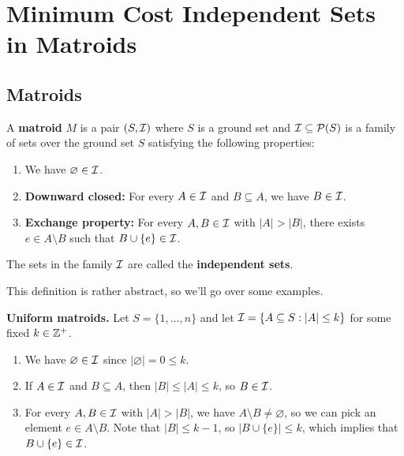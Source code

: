 \section{Minimum Cost Independent Sets in Matroids}\label{sec:4}

\subsection{Matroids}\label{subsec:4.1}
A {\bf matroid} $M$ is a pair $(S, {\cal I})$ where $S$ is a ground set 
and ${\cal I} \subseteq {\cal P}(S)$ is a family of sets over the 
ground set $S$ satisfying the following properties:
\begin{enumerate}[(1)]
    \item We have $\varnothing \in {\cal I}$.
    \item {\bf Downward closed:} For every $A \in {\cal I}$ and $B \subseteq A$, 
    we have $B \in {\cal I}$. 
    \item {\bf Exchange property:} For every $A, B \in {\cal I}$ with 
    $|A| > |B|$, there exists $e \in A \setminus B$ such that $B \cup \{e\} \in {\cal I}$. 
\end{enumerate}
The sets in the family ${\cal I}$ are called the {\bf independent sets}.

This definition is rather abstract, so we'll go over some examples. 

{\bf Uniform matroids.} Let $S = \{1, \dots, n\}$ and let ${\cal I} = 
\{A \subseteq S : |A| \leq k\}$ for some fixed $k \in \mathbb{Z}^+$. 
\begin{enumerate}[(1)]
    \item We have $\varnothing \in {\cal I}$ since $|\varnothing| = 0 \leq k$. 
    \item If $A \in {\cal I}$ and $B \subseteq A$, then $|B| \leq |A| \leq k$, 
    so $B \in {\cal I}$. 
    \item For every $A, B \in {\cal I}$ with $|A| > |B|$, we have 
    $A \setminus B \neq \varnothing$, so we can pick an element $e \in A 
    \setminus B$. Note that $|B| \leq k-1$, so $|B \cup \{e\}| \leq k$, 
    which implies that $B \cup \{e\} \in {\cal I}$. 
\end{enumerate}

